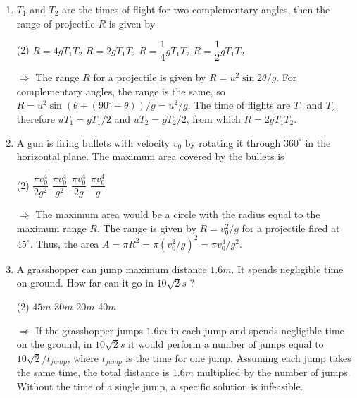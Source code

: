 \documentclass{article}
\renewcommand{\frac}[2]{\dfrac{#1}{#2}}
\newenvironment{solution}{\par\noindent\color{red!85!black}$\Rightarrow$\vspace{0em}}{}
\begin{document}
\begin{enumerate}
    \item $T_1$ and $T_2$ are the times of flight for two complementary angles, then the range of projectile $R$ is given by
        \begin{tasks}(2)
            \task $R = 4gT_1T_2$
            \task $R = 2gT_1T_2$\ans
            \task $R = \frac{1}{4}gT_1T_2$
            \task $R = \frac{1}{2}gT_1T_2$
        \end{tasks}
    \begin{solution}
        The range $R$ for a projectile is given by $R=u^2\sin{2\theta}/g$. For complementary angles, the range is the same, so $R=u^2\sin{(\theta+(90^\circ-\theta))}/g=u^2/g$. The time of flights are $T_1$ and $T_2$, therefore $uT_1=gT_1/2$ and $uT_2=gT_2/2$, from which $R=2gT_1T_2$.
    \end{solution}
    
    \item A gun is firing bullets with velocity $v_0$ by rotating it through $360^\circ$ in the horizontal plane. The maximum area covered by the bullets is
        \begin{tasks}(2)
            \task $\frac{\pi v_0^4}{2g^2}$
            \task $\frac{\pi v_0^4}{g^2}$\ans
            \task $\frac{\pi v_0^4}{2g}$
            \task $\frac{\pi v_0^4}{g}$
        \end{tasks}
    \begin{solution}
        The maximum area would be a circle with the radius equal to the maximum range $R$. The range is given by $R = v_0^2/g$ for a projectile fired at $45^\circ$. Thus, the area $A = \pi R^2 = \pi (v_0^2/g)^2 = \pi v_0^4/g^2$.
    \end{solution}
    
    \item A grasshopper can jump maximum distance $1.6 m$. It spends negligible time on ground. How far can it go in $10\sqrt{2} s$ ?
        \begin{tasks}(2)
            \task $45 m$
            \task $30 m$
            \task $20 m$
            \task $40 m$\ans
        \end{tasks}
    \begin{solution}
        If the grasshopper jumps $1.6 m$ in each jump and spends negligible time on the ground, in $10\sqrt{2} s$ it would perform a number of jumps equal to $10\sqrt{2}/t_{jump}$, where $t_{jump}$ is the time for one jump. Assuming each jump takes the same time, the total distance is $1.6 m$ multiplied by the number of jumps. Without the time of a single jump, a specific solution is infeasible.
    \end{solution}
\end{enumerate}
\end{document}
